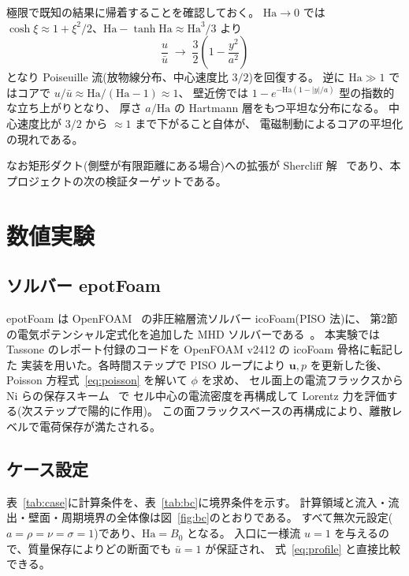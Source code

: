\documentclass{ltjsarticle}   %
\newcommand{\Ha}{\mathrm{Ha}}
\begin{document}
極限で既知の結果に帰着することを確認しておく。
$\Ha\to 0$ では $\cosh\xi \approx 1+\xi^2/2$、$\Ha-\tanh\Ha \approx \Ha^3/3$ より
\begin{equation}
  \frac{u}{\bar{u}} \;\longrightarrow\; \frac{3}{2}\left(1-\frac{y^2}{a^2}\right)
\end{equation}
となり Poiseuille 流(放物線分布、中心速度比 $3/2$)を回復する。
逆に $\Ha\gg 1$ ではコアで $u/\bar{u} \approx \Ha/(\Ha-1) \approx 1$、
壁近傍では $1-e^{-\Ha(1-|y|/a)}$ 型の指数的な立ち上がりとなり、
厚さ $a/\Ha$ の Hartmann 層をもつ平坦な分布になる。
中心速度比が $3/2$ から $\approx 1$ まで下がること自体が、
電磁制動によるコアの平坦化の現れである。

なお矩形ダクト(側壁が有限距離にある場合)への拡張が Shercliff 解~\cite{shercliff1953}
であり、本プロジェクトの次の検証ターゲットである。

\section{数値実験}
\label{sec:numerical}

\subsection{ソルバー epotFoam}

epotFoam は OpenFOAM~\cite{weller1998} の非圧縮層流ソルバー icoFoam(PISO 法)に、
第2節の電気ポテンシャル定式化を追加した MHD ソルバーである~\cite{tassone2016}。
本実験では Tassone のレポート付録のコードを OpenFOAM v2412 の icoFoam 骨格に転記した
実装を用いた。各時間ステップで PISO ループにより $\boldsymbol{u},p$ を更新した後、
Poisson 方程式~\eqref{eq:poisson} を解いて $\phi$ を求め、
セル面上の電流フラックスから Ni らの保存スキーム~\cite{ni2007} で
セル中心の電流密度を再構成して Lorentz 力を評価する(次ステップで陽的に作用)。
この面フラックスベースの再構成により、離散レベルで電荷保存が満たされる。

\subsection{ケース設定}

表~\ref{tab:case}に計算条件を、表~\ref{tab:bc}に境界条件を示す。
計算領域と流入・流出・壁面・周期境界の全体像は図~\ref{fig:bc}のとおりである。
すべて無次元設定($a=\rho=\nu=\sigma=1$)であり、$\Ha = B_0$ となる。
入口に一様流 $u=1$ を与えるので、質量保存によりどの断面でも $\bar{u}=1$ が保証され、
式~\eqref{eq:profile} と直接比較できる。
\end{document}
